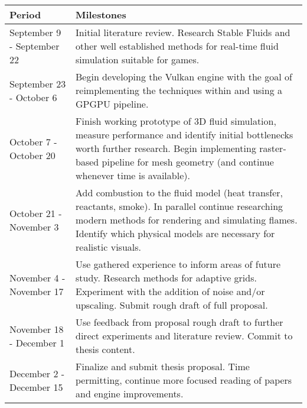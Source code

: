 \documentclass[a4paper, 11pt, titlepage]{article}
\begin{document}
\begin{tabularx}{\textwidth}{|X|X|}
\hline
\textbf{Period} & \textbf{Milestones} \\
\hline
September 9 - September 22 & 
\multicolumn{1}{X|}{Initial literature review. Research Stable Fluids \cite{stam} and other well
established methods for real-time fluid simulation suitable for games.} \\
\hline
September 23 - October 6 & \multicolumn{1}{X|}{
Begin developing the Vulkan engine with the goal of
reimplementing the techniques within \cite{stam} and \cite{nguyen} using a GPGPU
pipeline.} \\
\hline
October 7 - October 20 & \multicolumn{1}{X|}{
Finish working prototype of 3D fluid simulation, measure
performance and identify initial bottlenecks worth further research.
Begin implementing raster-based pipeline for mesh
geometry (and continue whenever time is available).} \\
\hline
October 21 - November 3 & \multicolumn{1}{X|}{
Add combustion  to the fluid model (heat transfer, reactants, smoke). In parallel continue researching modern methods
for rendering and simulating flames. Identify which physical models are
necessary for realistic visuals.
}\\
\hline
November 4 - November 17 & \multicolumn{1}{X|}{
Use gathered experience to inform areas of future study. Research methods for
adaptive grids. Experiment with the addition of noise and/or upscaling.
Submit rough draft of full proposal.
}\\
\hline
November 18 - December 1 & \multicolumn{1}{X|}{
Use feedback from proposal rough draft to further direct experiments and
literature review. Commit to thesis content.
}\\
\hline
December 2 - December 15 & \multicolumn{1}{X|}{
Finalize and submit thesis proposal. Time permitting, continue more focused
reading of papers and engine improvements.
}\\
\hline
\end{tabularx}

\pagebreak
\printbibliography
\end{document}
